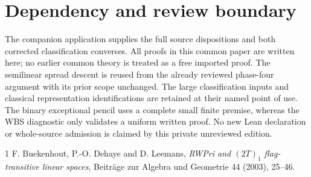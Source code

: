 \documentclass[11pt,a4paper]{article}
\begin{document}
\section{Dependency and review boundary}
The companion application supplies the full source dispositions and both
corrected classification converses. All proofs in this common paper are
written here; no earlier common theory is treated as a free imported proof.
The semilinear spread descent is reused from the already reviewed phase-four
argument with its prior scope unchanged. The large classification inputs
and classical representation identifications are retained at their named
point of use. The binary exceptional pencil uses a complete small finite
premise, whereas the WBS diagnostic only validates a uniform written proof.
No new Lean declaration or whole-source admission is claimed by this private
unreviewed edition.

\begin{thebibliography}{1}
 F. Buekenhout, P.-O. Dehaye and D. Leemans,
\emph{RWPri and $(2T)_1$ flag-transitive linear spaces},
Beitr\"age zur Algebra und Geometrie 44 (2003), 25--46.
\end{thebibliography}
\end{document}
